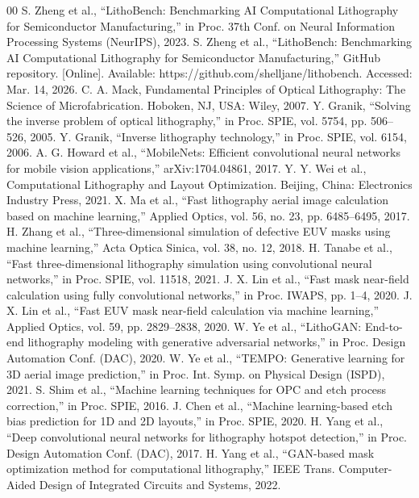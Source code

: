 \documentclass[conference]{IEEEtran}
\begin{document}
\begin{thebibliography}{00}
 S. Zheng et al., “LithoBench: Benchmarking AI Computational Lithography for Semiconductor Manufacturing,” in Proc. 37th Conf. on Neural Information Processing Systems (NeurIPS), 2023.
 S. Zheng et al., “LithoBench: Benchmarking AI Computational Lithography for Semiconductor Manufacturing,” GitHub repository. [Online]. Available: https://github.com/shelljane/lithobench. Accessed: Mar. 14, 2026.
 C. A. Mack, Fundamental Principles of Optical Lithography: The Science of Microfabrication. Hoboken, NJ, USA: Wiley, 2007.
 Y. Granik, “Solving the inverse problem of optical lithography,” in Proc. SPIE, vol. 5754, pp. 506–526, 2005.
 Y. Granik, “Inverse lithography technology,” in Proc. SPIE, vol. 6154, 2006.
 A. G. Howard et al., “MobileNets: Efficient convolutional neural networks for mobile vision applications,” arXiv:1704.04861, 2017.
 Y. Y. Wei et al., Computational Lithography and Layout Optimization. Beijing, China: Electronics Industry Press, 2021.
 X. Ma et al., “Fast lithography aerial image calculation based on machine learning,” Applied Optics, vol. 56, no. 23, pp. 6485–6495, 2017.
 H. Zhang et al., “Three-dimensional simulation of defective EUV masks using machine learning,” Acta Optica Sinica, vol. 38, no. 12, 2018.
 H. Tanabe et al., “Fast three-dimensional lithography simulation using convolutional neural networks,” in Proc. SPIE, vol. 11518, 2021.
 J. X. Lin et al., “Fast mask near-field calculation using fully convolutional networks,” in Proc. IWAPS, pp. 1–4, 2020.
 J. X. Lin et al., “Fast EUV mask near-field calculation via machine learning,” Applied Optics, vol. 59, pp. 2829–2838, 2020.
 W. Ye et al., “LithoGAN: End-to-end lithography modeling with generative adversarial networks,” in Proc. Design Automation Conf. (DAC), 2020.
 W. Ye et al., “TEMPO: Generative learning for 3D aerial image prediction,” in Proc. Int. Symp. on Physical Design (ISPD), 2021.
 S. Shim et al., “Machine learning techniques for OPC and etch process correction,” in Proc. SPIE, 2016.
 J. Chen et al., “Machine learning-based etch bias prediction for 1D and 2D layouts,” in Proc. SPIE, 2020.
 H. Yang et al., “Deep convolutional neural networks for lithography hotspot detection,” in Proc. Design Automation Conf. (DAC), 2017.
 H. Yang et al., “GAN-based mask optimization method for computational lithography,” IEEE Trans. Computer-Aided Design of Integrated Circuits and Systems, 2022.

\end{thebibliography}
\end{document}
